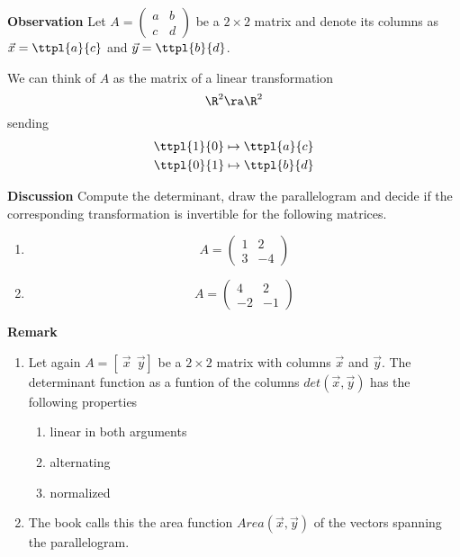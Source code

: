 \documentclass[letterpaper, 10pt]{article}
\begin{document}
\newpage
\lb
\textbf{Observation}
\lb
Let $A = \begin{pmatrix} a & b \\ c & d \end{pmatrix}$ be a $2 \times 2$ matrix and denote
its columns as $\vec x = \ttpl{a}{c}$ and $\vec y = \ttpl{b}{d}$.

\lb
We can think of $A$ as the matrix of a linear transformation
\[ \R^2 \ra \R^2 \]
sending 
\begin{align*}
    \ttpl{1}{0} \mapsto \ttpl{a}{c} \\
    \ttpl{0}{1} \mapsto \ttpl{b}{d}
\end{align*}







\newpage
\lb
\textbf{Discussion}
\lb
Compute the determinant, draw the parallelogram and decide if the corresponding transformation
is invertible for the following matrices.
\begin{enumerate}
    \item
        \[ A = \begin{pmatrix} 1 & 2 \\ 3 & -4 \end{pmatrix} \]
    \vspace{200pt}
    \item
        \[ A = \begin{pmatrix} 4 & 2 \\ -2 & -1 \end{pmatrix} \]
\end{enumerate}





\newpage
\lb
\textbf{Remark}
\lb
\begin{enumerate}
    \item Let again $A = [ ~ \vec x ~~ \vec y ] $ be a $ 2 \times 2 $ matrix with columns
        $\vec x$ and $\vec y$.
        The determinant function as a funtion of the columns $ det(\vec x, \vec y)$
        has the following properties
        \begin{enumerate}
            \item linear in both arguments
            \vspace{50pt}
            \item alternating
            \vspace{50pt}
            \item normalized
            \vspace{50pt}
        \end{enumerate}
    \item
        The book calls this the area function $Area(\vec x , \vec y)$ of the vectors spanning
        the parallelogram.
\end{enumerate}
\end{document}
